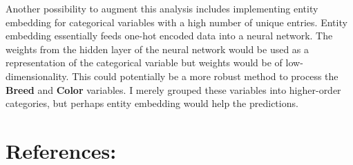 \documentclass[12pt]{article} %
\begin{document}
Another possibility to augment this analysis includes implementing entity embedding for categorical variables with a high number of unique entries. Entity embedding essentially feeds one-hot encoded data into a neural network. The weights from the hidden layer of the neural network would be used as a representation of the categorical variable but weights would be of low-dimensionality. This could potentially be a more robust method to process the \textbf{Breed} and \textbf{Color} variables. I merely grouped these variables into higher-order categories, but perhaps entity embedding would help the predictions. 

\newpage

\section{References:}
\end{document}
